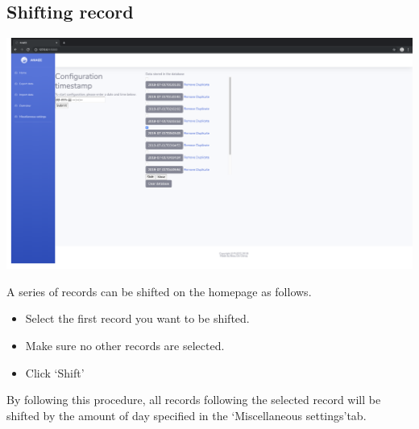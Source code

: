 \documentclass[12pt]{article}
\begin{document}
\subsection{Shifting record}
\begin{center}
	\includegraphics[width=\linewidth]{images/Shift_entries.png}
\end{center}
A series of records can be shifted on the homepage as follows.
\begin{itemize}
	\item Select the first record you want to be shifted.
	\item Make sure no other records are selected.
	\item Click \lq Shift\rq
\end{itemize}
By following this procedure, all records following the selected record will be shifted by the amount of day specified in the \lq Miscellaneous settings\rq tab.
\end{document}
